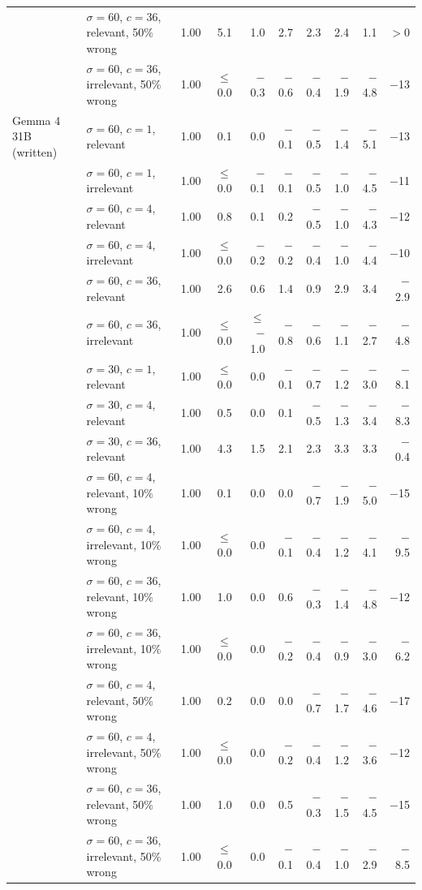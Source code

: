 \begin{tabular}{llrrrrrrrr}
 & $\sigma = 60$, $c = 36$, relevant, 50\% wrong & 1.00 & 5.1 & 1.0 & 2.7 & 2.3 & 2.4 & 1.1 & $> 0$ \\
 & $\sigma = 60$, $c = 36$, irrelevant, 50\% wrong & 1.00 & $\leq$ 0.0 & $-$0.3 & $-$0.6 & $-$0.4 & $-$1.9 & $-$4.8 & $-$13 \\
\midrule
Gemma 4 31B (written) & $\sigma = 60$, $c = 1$, relevant & 1.00 & 0.1 & 0.0 & $-$0.1 & $-$0.5 & $-$1.4 & $-$5.1 & $-$13 \\
 & $\sigma = 60$, $c = 1$, irrelevant & 1.00 & $\leq$ 0.0 & $-$0.1 & $-$0.1 & $-$0.5 & $-$1.0 & $-$4.5 & $-$11 \\
 & $\sigma = 60$, $c = 4$, relevant & 1.00 & 0.8 & 0.1 & 0.2 & $-$0.5 & $-$1.0 & $-$4.3 & $-$12 \\
 & $\sigma = 60$, $c = 4$, irrelevant & 1.00 & $\leq$ 0.0 & $-$0.2 & $-$0.2 & $-$0.4 & $-$1.0 & $-$4.4 & $-$10 \\
 & $\sigma = 60$, $c = 36$, relevant & 1.00 & 2.6 & 0.6 & 1.4 & 0.9 & 2.9 & 3.4 & $-$2.9 \\
 & $\sigma = 60$, $c = 36$, irrelevant & 1.00 & $\leq$ 0.0 & $\leq$ $-$1.0 & $-$0.8 & $-$0.6 & $-$1.1 & $-$2.7 & $-$4.8 \\
 & $\sigma = 30$, $c = 1$, relevant & 1.00 & $\leq$ 0.0 & 0.0 & $-$0.1 & $-$0.7 & $-$1.2 & $-$3.0 & $-$8.1 \\
 & $\sigma = 30$, $c = 4$, relevant & 1.00 & 0.5 & 0.0 & 0.1 & $-$0.5 & $-$1.3 & $-$3.4 & $-$8.3 \\
 & $\sigma = 30$, $c = 36$, relevant & 1.00 & 4.3 & 1.5 & 2.1 & 2.3 & 3.3 & 3.3 & $-$0.4 \\
 & $\sigma = 60$, $c = 4$, relevant, 10\% wrong & 1.00 & 0.1 & 0.0 & 0.0 & $-$0.7 & $-$1.9 & $-$5.0 & $-$15 \\
 & $\sigma = 60$, $c = 4$, irrelevant, 10\% wrong & 1.00 & $\leq$ 0.0 & 0.0 & $-$0.1 & $-$0.4 & $-$1.2 & $-$4.1 & $-$9.5 \\
 & $\sigma = 60$, $c = 36$, relevant, 10\% wrong & 1.00 & 1.0 & 0.0 & 0.6 & $-$0.3 & $-$1.4 & $-$4.8 & $-$12 \\
 & $\sigma = 60$, $c = 36$, irrelevant, 10\% wrong & 1.00 & $\leq$ 0.0 & 0.0 & $-$0.2 & $-$0.4 & $-$0.9 & $-$3.0 & $-$6.2 \\
 & $\sigma = 60$, $c = 4$, relevant, 50\% wrong & 1.00 & 0.2 & 0.0 & 0.0 & $-$0.7 & $-$1.7 & $-$4.6 & $-$17 \\
 & $\sigma = 60$, $c = 4$, irrelevant, 50\% wrong & 1.00 & $\leq$ 0.0 & 0.0 & $-$0.2 & $-$0.4 & $-$1.2 & $-$3.6 & $-$12 \\
 & $\sigma = 60$, $c = 36$, relevant, 50\% wrong & 1.00 & 1.0 & 0.0 & 0.5 & $-$0.3 & $-$1.5 & $-$4.5 & $-$15 \\
 & $\sigma = 60$, $c = 36$, irrelevant, 50\% wrong & 1.00 & $\leq$ 0.0 & 0.0 & $-$0.1 & $-$0.4 & $-$1.0 & $-$2.9 & $-$8.5 \\
\bottomrule
\end{tabular}
